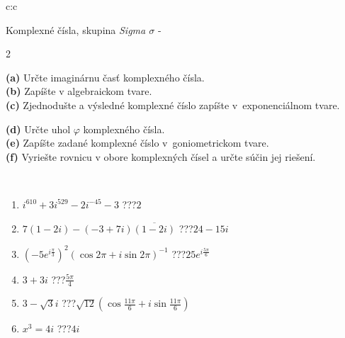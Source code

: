 \documentclass[10pt]{report}
\begin{document}
\begin{tabular}{c:c}
\begin{minipage}[c][104.5mm][t]{0.5\linewidth}
\begin{center}
\vspace{7mm}
{\huge Komplexné čísla, skupina \textit{Sigma $\sigma$} -}\\[5mm]
\begin{minipage}{0.95\linewidth}
\begin{center}
{\small \begin{multicols}{2} \raggedright
\textbf{(a)} Určte imaginárnu časť komplexného čísla. \\[1mm]
\textbf{(b)} Zapíšte v algebraickom tvare. \\[1mm]
\textbf{(c)} Zjednodušte a výsledné komplexné číslo zapíšte v~exponenciálnom tvare. \par \columnbreak
\textbf{(d)} Určte uhol \(\varphi\) komplexného čísla. \\[1mm]
\textbf{(e)} Zapíšte zadané komplexné číslo v~goniometrickom tvare. \\[1mm]
\textbf{(f)} Vyriešte rovnicu v obore komplexných čísel a určte súčin jej riešení.
\end{multicols}
}
\end{center}
\end{minipage}
\\[4mm]
\begin{minipage}{0.79\linewidth}
\begin{center}
\begin{varwidth}{\linewidth}
\begin{enumerate}
\large
\item $i^{610}+3i^{529}-2i^{-45}-3$\quad \dotfill\; ???\;\dotfill \quad $2$
\item $7(1-2i)-(-3+7i)\overline{(1-2i)}$\quad \dotfill\; ???\;\dotfill \quad $24-15i$
\item $\left(-5e^{i\frac{\pi}{3}}\right)^{2}\left(\cos{2\pi}+i\sin{2\pi}\right)^{-1}$\quad \dotfill\; ???\;\dotfill \quad $25e^{i\frac{5\pi}{6}}$
\item $3+3i$\quad \dotfill\; ???\;\dotfill \quad $\frac{5\pi}{4}$
\item $3-\sqrt{3}i$\quad \dotfill\; ???\;\dotfill \quad $\sqrt{12}\left(\cos{\frac{11\pi}{6}}+i\sin{\frac{11\pi}{6}}\right)$
\item $x^3=4i$\quad \dotfill\; ???\;\dotfill \quad $4i$
\end{enumerate}
\end{varwidth}

\end{center}
\end{minipage}
\end{center}
\end{minipage}
\end{tabular}
\end{document}

